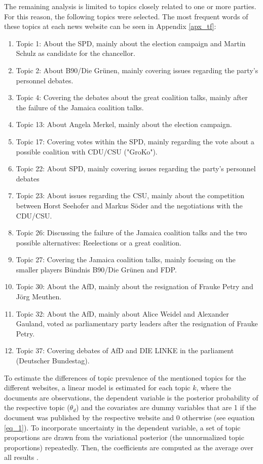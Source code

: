 \documentclass[12pt,a4paper,notitlepage]{article}
\begin{document}
The remaining analysis is limited to topics closely related to one or more parties. For this reason, the following topics were selected. The most frequent words of these topics at each news website can be seen in Appendix \ref{apx_tf}: 

\begin{enumerate}
	\item Topic 1: About the SPD, mainly about the election campaign and Martin Schulz as candidate for the chancellor.	
	\item Topic 2: About B90/Die Grünen, mainly covering issues regarding the party's personnel debates.
	\item Topic 4: Covering the debates about the great coalition talks, mainly after the failure of the Jamaica coalition talks.
	\item Topic 13: About Angela Merkel, mainly about the election campaign. 
	\item Topic 17: Covering votes within the SPD, mainly regarding the vote about a possible coalition with CDU/CSU ("GroKo").	
	\item Topic 22: About SPD, mainly covering issues regarding the party's personnel debates
	\item Topic 23: About issues regarding the CSU, mainly about the competition between Horst Seehofer and Markus Söder and the negotiations with the CDU/CSU.
	\item Topic 26: Discussing the failure of the Jamaica coalition talks and the two possible alternatives: Reelections or a great coalition.
	\item Topic 27: Covering the Jamaica coalition talks, mainly focusing on the smaller players Bündnis B90/Die Grünen and FDP.	
	\item Topic 30: About the AfD, mainly about the resignation of Frauke Petry and Jörg Meuthen.
	\item Topic 32: About the AfD, mainly about Alice Weidel and Alexander Gauland, voted as parliamentary party leaders after the resignation of Frauke Petry.
	\item Topic 37: Covering debates of AfD and DIE LINKE in the parliament (Deutscher Bundestag).
\end{enumerate}   

To estimate the differences of topic prevalence of the mentioned topics for the different websites, a linear model is estimated for each topic $k$, where the documents are observations, the dependent variable is the posterior probability of the respective topic ($\theta_{d}$) and the covariates are dummy variables that are 1 if the document was published by the respective website and 0 otherwise (see equation \ref{eq_1}). To incorporate uncertainty in the dependent variable, a set of topic proportions are drawn from the variational posterior (the unnormalized topic proportions) repeatedly. Then, the coefficients are computed as the average over all results \citep{roberts_model_2016}.
\end{document}
